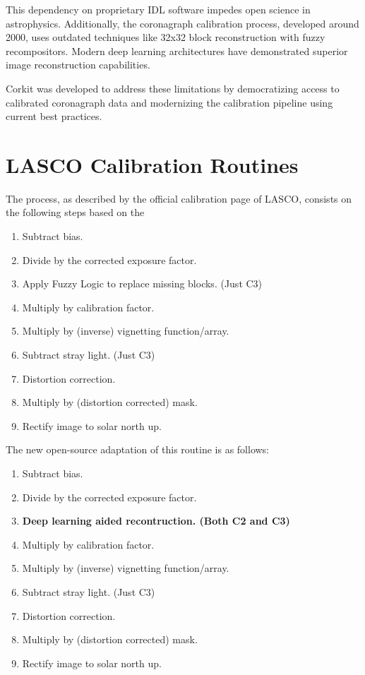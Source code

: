 \documentclass[draft]{agujournal2019}
\begin{document}
This dependency on proprietary IDL software impedes open science in astrophysics. Additionally, the coronagraph calibration process, developed around 2000, uses outdated techniques like 32x32 block reconstruction with fuzzy recompositors. Modern deep learning architectures have demonstrated superior image reconstruction capabilities.

Corkit was developed to address these limitations by democratizing access to calibrated coronagraph data and modernizing the calibration pipeline using current best practices.

\section{LASCO Calibration Routines}

The process, as described by the official calibration page of LASCO, consists on the following steps based on the %

\begin{enumerate}
    \item Subtract bias.
    \item Divide by the corrected exposure factor.
    \item Apply Fuzzy Logic to replace missing blocks. (Just C3)
    \item Multiply by calibration factor.
    \item Multiply by (inverse) vignetting function/array.
    \item Subtract stray light. (Just C3)
    \item Distortion correction.
    \item Multiply by (distortion corrected) mask.
    \item Rectify image to solar north up.
\end{enumerate}

The new open-source adaptation of this routine is as follows:

\begin{enumerate}
    \item Subtract bias.
    \item Divide by the corrected exposure factor.
    \item \textbf{Deep learning aided recontruction. (Both C2 and C3)}
    \item Multiply by calibration factor.
    \item Multiply by (inverse) vignetting function/array.
    \item Subtract stray light. (Just C3)
    \item Distortion correction.
    \item Multiply by (distortion corrected) mask.
    \item Rectify image to solar north up.
\end{enumerate}
\end{document}
